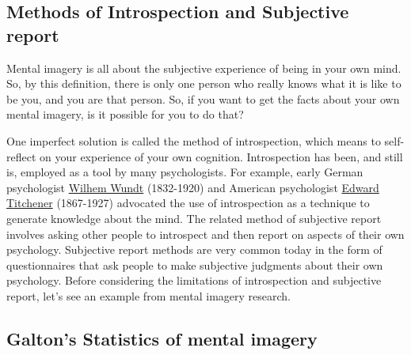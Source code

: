 \documentclass[
  oneside,
  12pt]{crumpbook}
\begin{document}
\hypertarget{methods-of-introspection-and-subjective-report}{%
\subsection{Methods of Introspection and Subjective report}\label{methods-of-introspection-and-subjective-report}}

Mental imagery is all about the subjective experience of being in your own mind. So, by this definition, there is only one person who really knows what it is like to be you, and you are that person. So, if you want to get the facts about your own mental imagery, is it possible for you to do that?

One imperfect solution is called the method of introspection, which means to self-reflect on your experience of your own cognition. Introspection has been, and still is, employed as a tool by many psychologists. For example, early German psychologist \href{https://en.wikipedia.org/wiki/Wilhelm_Wundt}{Wilhem Wundt} (1832-1920) and American psychologist \href{https://en.wikipedia.org/wiki/Edward_B._Titchener}{Edward Titchener} (1867-1927) advocated the use of introspection as a technique to generate knowledge about the mind. The related method of subjective report involves asking other people to introspect and then report on aspects of their own psychology. Subjective report methods are very common today in the form of questionnaires that ask people to make subjective judgments about their own psychology. Before considering the limitations of introspection and subjective report, let's see an example from mental imagery research.

\hypertarget{galtons-statistics-of-mental-imagery}{%
\subsection{Galton's Statistics of mental imagery}\label{galtons-statistics-of-mental-imagery}}
\end{document}
